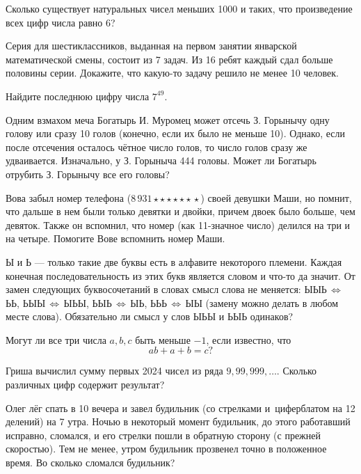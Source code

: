 \documentclass{article}
\begin{document}
\begin{enumerate_boxed}
        \item Сколько существует натуральных чисел меньших 1000 и таких, что произведение всех цифр числа равно 6?

        \item Серия для шестиклассников, выданная на первом занятии январской математической смены, состоит из 7 задач.
        Из 16 ребят каждый сдал больше половины серии.
        Докажите, что какую-то задачу решило не менее 10 человек.

        \item Найдите последнюю цифру числа $7^{49}$.


        \item Одним взмахом меча Богатырь И.
        Муромец может отсечь З.
        Горынычу одну голову или сразу 10 голов (конечно, если их было не меньше 10).
        Однако, если после отсечения осталось чётное число голов, то число голов сразу же удваивается.
        Изначально, у З.
        Горыныча 444 головы.
        Может ли Богатырь отрубить З.
        Горынычу все его головы?

        \item Вова забыл номер телефона ($8\,931\star\star\star\star\star\star\,\star$) своей девушки Маши, но помнит, что дальше в нем были только девятки и двойки, причем двоек было больше, чем девяток.
        Также он вспомнил, что номер (как 11-значное число) делился на три и на четыре.
        Помогите Вове вспомнить номер Маши.

        \item Ы и Ь --- только такие две буквы есть в алфавите некоторого племени.
        Каждая конечная последовательность из этих букв является словом и что-то да значит.
        От замен следующих буквосочетаний в словах смысл слова не меняется: ЫЫЬ\,$\Leftrightarrow$\,ЬЬ, ЬЫЫ\,$\Leftrightarrow$\,ЫЬЫ, ЬЫЬ\,$\Leftrightarrow$\,ЫЬ, ЬЬЬ\,$\Leftrightarrow$\,ЫЫ (замену можно делать в любом месте слова).
        Обязательно ли смысл у слов ЫЬЫ и ЬЫЬ одинаков?

        \item Могут ли все три числа $a, b, c$ быть меньше $-1$, если известно, что \[ab+a+b = c?\]

        \item Гриша вычислил сумму первых 2024 чисел из ряда $9, 99, 999, \ldots$.
        Сколько различных цифр содержит результат?

        \item Олег лёг спать в 10 вечера и завел будильник (со стрелками и~циферблатом на 12 делений) на 7 утра.
        Ночью в некоторый момент будильник, до этого работавший исправно, сломался, и его стрелки пошли в обратную сторону (с прежней скоростью).
        Тем не менее, утром будильник прозвенел точно в положенное время.
        Во сколько сломался будильник?


\end{enumerate_boxed}
\end{document}
